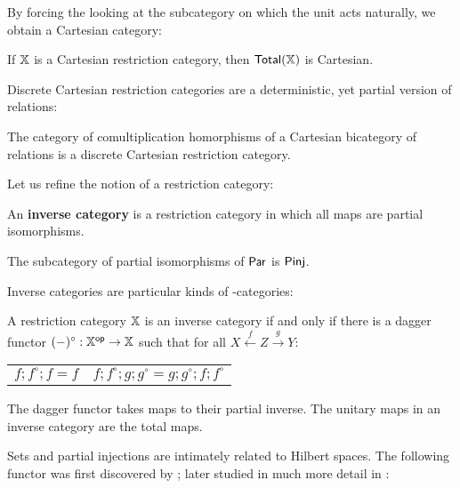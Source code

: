By forcing the looking at the subcategory on which the unit acts naturally,  we obtain a Cartesian category:

\begin{proposition} 
\label{prop:cartesian}
If $\mathbb{X}$ is a  Cartesian restriction category, then $\mathsf{Total}(\mathbb{X})$ is Cartesian.
\end{proposition}

Discrete Cartesian restriction categories are a deterministic, yet partial version of relations:

\begin{lemma}
The category of comultiplication homorphisms of a Cartesian bicategory of relations is a discrete Cartesian restriction category.
\end{lemma}

Let us refine the notion of a restriction category:

\begin{definition}
An {\bf inverse category} is a restriction category in which all maps are partial isomorphisms.
\end{definition}

\begin{example}
The subcategory of partial isomorphisms of $\mathsf{Par}$ is  $\mathsf{Pinj}$.
\end{example}

Inverse categories are particular kinds of \dag-categories:

\begin{theorem}
A restriction category $\mathbb{X}$ is an inverse category if and only if there is a dagger functor $(-)^\circ:\mathbb{X}^{\mathsf{op}}\to\mathbb{X}$ such that for all $X\xleftarrow{f} Z \xrightarrow{g} Y$:
\begin{center}
\begin{tabular}{cc}
 $f; f^\circ ; f = f$ & 
 $f ; f ^\circ ;g; g^\circ = g;g^\circ ; f; f ^\circ $
\end{tabular}
\end{center}
\end{theorem}

The dagger functor takes maps to their partial inverse.
The unitary maps in an inverse category are the total maps.


Sets and partial injections are intimately related to Hilbert spaces.  The following functor was first discovered by \cite{barr}; later studied in much more detail in \cite{elltwo}:

